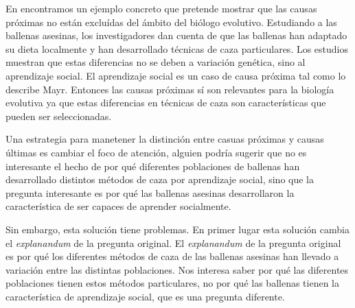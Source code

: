 
En \cite{Uller2019} encontramos un ejemplo concreto que pretende mostrar que las causas próximas no están excluídas del ámbito del biólogo evolutivo. Estudiando a las ballenas asesinas, los investigadores dan cuenta de que las ballenas han adaptado su dieta localmente y han desarrollado técnicas de caza particulares. Los estudios muestran que estas diferencias no se deben a variación genética, sino al aprendizaje social. El aprendizaje social es un caso de causa próxima tal como lo describe Mayr. Entonces las causas próximas sí son relevantes para la biología evolutiva ya que estas diferencias en técnicas de caza son características que pueden ser seleccionadas.

Una estrategia para manetener la distinción entre casuas próximas y causas últimas es cambiar el foco de atención, alguien podría sugerir que no es interesante el hecho de por qué diferentes poblaciones de ballenas han desarrollado distintos métodos de caza por aprendizaje social, sino que la pregunta interesante es por qué las ballenas asesinas desarrollaron la característica de ser capaces de aprender socialmente.

Sin embargo, esta solución tiene problemas. En primer lugar esta solución cambia el \emph{explanandum} de la pregunta original. El \emph{explanandum} de la pregunta original es por qué los diferentes métodos de caza de las ballenas asesinas han llevado a variación entre las distintas poblaciones. Nos interesa saber por qué las diferentes poblaciones tienen estos métodos particulares, no por qué las ballenas tienen la característica de aprendizaje social, que es una pregunta diferente.



